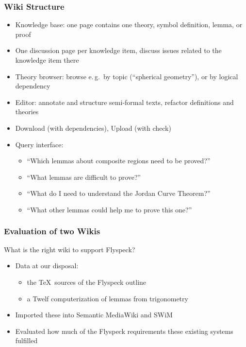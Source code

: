 \documentclass[pdftex]{beamer}
\begin{document}
\begin{frame}
  \frametitle{Wiki Structure}
  \begin{itemize}
  \item Knowledge base: one page contains one theory, symbol definition,
    lemma, or proof
  \item One discussion page per knowledge item, discuss issues related to the
    knowledge item there
  \item Theory browser: browse e.\,g.\ by topic (``spherical geometry''), or by
    logical dependency
  \item Editor: annotate and structure semi-formal texts, refactor definitions
    and theories
  \item Download (with dependencies), Upload (with check)
  \item Query interface:
    \begin{itemize}
    \item ``Which lemmas about composite regions need to be proved?''
    \item ``What lemmas are difficult to prove?''
    \item ``What do I need to understand the Jordan Curve Theorem?''
    \item ``What other lemmas could help me to prove this one?''
    \end{itemize}
  \end{itemize}
\end{frame}
\begin{frame}
  \frametitle{Evaluation of two Wikis}
  What is the right wiki to support Flyspeck?
  \begin{itemize}
  \item Data at our disposal: 
    \begin{itemize}
    \item the \TeX\ sources of the Flyspeck outline
    \item a Twelf computerization of lemmas from trigonometry
    \end{itemize}
  \item Imported these into Semantic MediaWiki and SWiM
  \item Evaluated how much of the Flyspeck requirements these existing systems
    fulfilled
  \end{itemize}
\end{frame}
\end{document}
